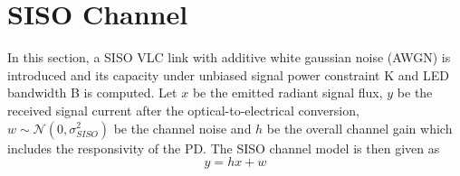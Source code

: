 \section{SISO Channel}
\label{sec:sisoChannel}
\graphicspath{{_SISO/Figures/}}

In this section, a SISO VLC link with additive white gaussian noise (AWGN) is introduced and its capacity under unbiased signal power constraint K and LED bandwidth B is computed. Let $x$ be the emitted radiant signal flux, $y$ be the received signal current after the optical-to-electrical conversion, $w\sim\mathcal{N}(0,\sigma_{SISO}^2)$ be the channel noise and $h$ be the overall channel gain which includes the responsivity of the PD. The SISO channel model is then given as
\begin{equation}
	\label{eqSisoChannel}
	y = hx + w
\end{equation}

%
%

